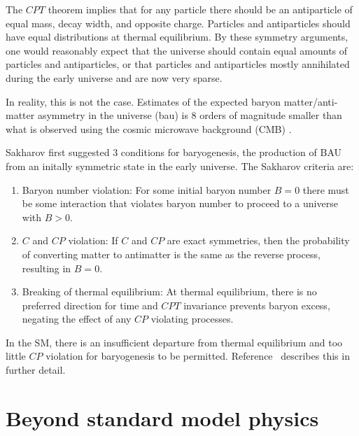 
The $CPT$ theorem implies that for any particle there should be an antiparticle of equal mass, decay width, and opposite charge. Particles and antiparticles should have equal distributions at thermal equilibrium. By these symmetry arguments, one would reasonably expect that the universe should contain equal amounts of particles and antiparticles, or that particles and antiparticles mostly annihilated during the early universe and are now very sparse.

In reality, this is not the case. Estimates of the expected baryon matter/anti-matter asymmetry in the universe (\acrshort*{bau}) is 8 orders of magnitude smaller than what is observed using the cosmic microwave background (CMB) \cite{Mor13, Dubbers2011}.

Sakharov \cite{Sakharov_1991} first suggested 3 conditions for baryogenesis, the production of BAU from an initally symmetric state in the early universe. The Sakharov criteria are:
%
\begin{enumerate}
    \item Baryon number violation: For some initial baryon number $B=0$ there must be some interaction that violates baryon number to proceed to a universe with $B>0$.
    \item $C$ and $CP$ violation: If $C$ and $CP$ are exact symmetries, then the probability of converting matter to antimatter is the same as the reverse process, resulting in $B=0$.
    \item Breaking of thermal equilibrium:  At thermal equilibrium, there is no preferred direction for time and $CPT$ invariance prevents baryon excess, negating the effect of any $CP$ violating processes.
\end{enumerate}

In the SM, there is an insufficient departure from thermal equilibrium and too little $CP$ violation for baryogenesis to be permitted. Reference~\cite{Dubbers2011} describes this in further detail.


\section{Beyond standard model physics}


